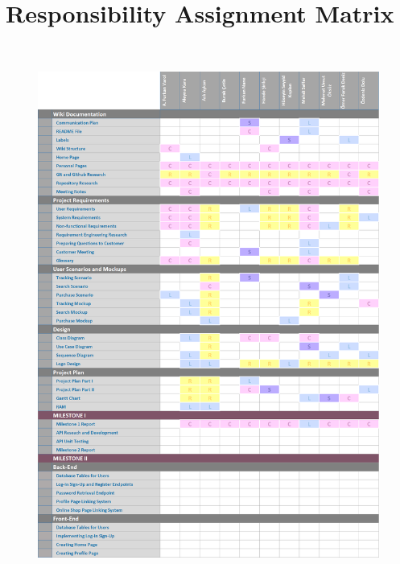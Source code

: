 \documentclass[]{article}
\begin{document}
\hypertarget{responsibility-assignment-matrix-1}{%
    \section{Responsibility Assignment
      Matrix}\label{responsibility-assignment-matrix-1}}

\begin{figure}[H]
    \centering
    \includegraphics[height=7in]{./images/ram-00.png}
\end{figure}
\end{document}
